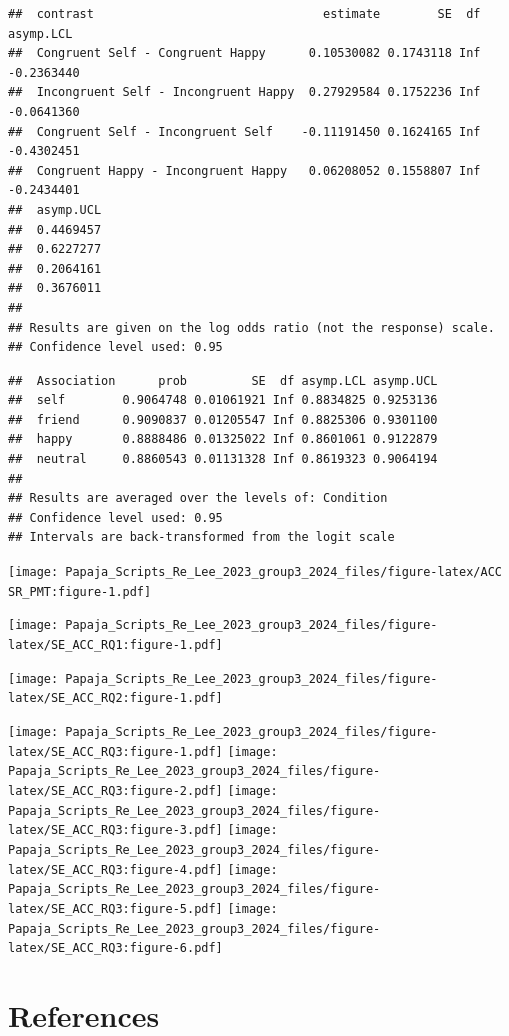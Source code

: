 \documentclass[
  man]{apa6}
\begin{document}
\begin{verbatim}
##  contrast                                estimate        SE  df  asymp.LCL
##  Congruent Self - Congruent Happy      0.10530082 0.1743118 Inf -0.2363440
##  Incongruent Self - Incongruent Happy  0.27929584 0.1752236 Inf -0.0641360
##  Congruent Self - Incongruent Self    -0.11191450 0.1624165 Inf -0.4302451
##  Congruent Happy - Incongruent Happy   0.06208052 0.1558807 Inf -0.2434401
##  asymp.UCL
##  0.4469457
##  0.6227277
##  0.2064161
##  0.3676011
## 
## Results are given on the log odds ratio (not the response) scale. 
## Confidence level used: 0.95
\end{verbatim}

\begin{verbatim}
##  Association      prob         SE  df asymp.LCL asymp.UCL
##  self        0.9064748 0.01061921 Inf 0.8834825 0.9253136
##  friend      0.9090837 0.01205547 Inf 0.8825306 0.9301100
##  happy       0.8888486 0.01325022 Inf 0.8601061 0.9122879
##  neutral     0.8860543 0.01131328 Inf 0.8619323 0.9064194
## 
## Results are averaged over the levels of: Condition 
## Confidence level used: 0.95 
## Intervals are back-transformed from the logit scale
\end{verbatim}

\texttt{[image: Papaja\_Scripts\_Re\_Lee\_2023\_group3\_2024\_files/figure-latex/ACC SR\_PMT:figure-1.pdf]}

\texttt{[image: Papaja\_Scripts\_Re\_Lee\_2023\_group3\_2024\_files/figure-latex/SE\_ACC\_RQ1:figure-1.pdf]}

\texttt{[image: Papaja\_Scripts\_Re\_Lee\_2023\_group3\_2024\_files/figure-latex/SE\_ACC\_RQ2:figure-1.pdf]}

\texttt{[image: Papaja\_Scripts\_Re\_Lee\_2023\_group3\_2024\_files/figure-latex/SE\_ACC\_RQ3:figure-1.pdf]} \texttt{[image: Papaja\_Scripts\_Re\_Lee\_2023\_group3\_2024\_files/figure-latex/SE\_ACC\_RQ3:figure-2.pdf]} \texttt{[image: Papaja\_Scripts\_Re\_Lee\_2023\_group3\_2024\_files/figure-latex/SE\_ACC\_RQ3:figure-3.pdf]} \texttt{[image: Papaja\_Scripts\_Re\_Lee\_2023\_group3\_2024\_files/figure-latex/SE\_ACC\_RQ3:figure-4.pdf]} \texttt{[image: Papaja\_Scripts\_Re\_Lee\_2023\_group3\_2024\_files/figure-latex/SE\_ACC\_RQ3:figure-5.pdf]} \texttt{[image: Papaja\_Scripts\_Re\_Lee\_2023\_group3\_2024\_files/figure-latex/SE\_ACC\_RQ3:figure-6.pdf]}

\section{References}\label{references}
\end{document}
